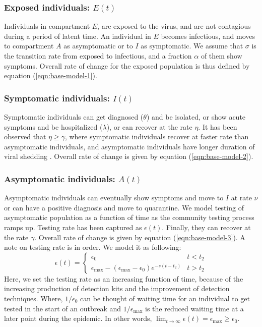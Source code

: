 \documentclass[authoryear,preprint]{elsarticle}
\begin{document}
\subsubsection{Exposed individuals: $E(t)$}
Individuals in compartment $E$, are exposed to the virus, and are not contagious during a period of latent time. An individual in $E$ becomes infectious, and moves to compartment $A$ as asymptomatic or to $I$ as symptomatic. We assume that $\sigma$ is the transition rate from exposed to infectious, and a fraction $\alpha$ of them show symptoms. Overall rate of change for the exposed population is thus defined by equation (\ref{eqn:base-model-1}).

\subsubsection{Symptomatic individuals: $I(t)$}
Symptomatic individuals can get diagnosed ($\theta$) and be isolated, or show acute symptoms and be hospitalized ($\lambda$), or can recover at the rate $\eta$. It has been observed that $\eta \geq \gamma$, where symptomatic individuals recover at faster rate than asymptomatic individuals, and asymptomatic individuals have longer duration of viral shedding \cite{Long2020}. Overall rate of change is given by equation (\ref{eqn:base-model-2}).

\subsubsection{Asymptomatic individuals: $A(t)$}
Asymptomatic individuals can eventually show symptoms and move to $I$ at rate $\nu$ or can have a positive diagnosis and move to quarantine. We model testing of asymptomatic population as a function of time as the community testing process ramps up. Testing rate has been captured as $\epsilon(t)$. Finally, they can recover at the rate $\gamma$. Overall rate of change is given by equation (\ref{eqn:base-model-3}). A note on testing rate is in order. We model it as following:
%
%
\begin{equation}
\epsilon(t) = 
\begin{cases}
\epsilon_0 & t < t_2 \\
\epsilon_{\max} - (\epsilon_{\max} - \epsilon_0) e^{-s \left( t-t_2\right) } & t > t_2
\end{cases}
\label{eqn:base-model-13}
\end{equation}
%
%
Here, we set the testing rate as an increasing function of time, because of the increasing production of detection kits and the improvement of detection techniques. Where, $1/ \epsilon_0$ can be thought of waiting time for an individual to get tested in the start of an outbreak and $1/\epsilon_{\max}$ is the reduced waiting time at a later point during the epidemic. In other words, $\lim_{t \rightarrow \infty}  \epsilon(t) =  \epsilon_{\max} \geq \epsilon_0$.
%
%
\end{document}
